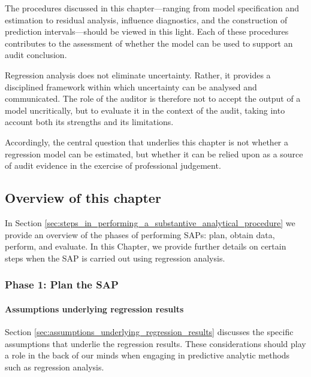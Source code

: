 The procedures discussed in this chapter—ranging from model specification and estimation to residual analysis, influence diagnostics, and the construction of prediction intervals—should be viewed in this light. Each of these procedures contributes to the assessment of whether the model can be used to support an audit conclusion.

Regression analysis does not eliminate uncertainty. Rather, it provides a disciplined framework within which uncertainty can be analysed and communicated. The role of the auditor is therefore not to accept the output of a model uncritically, but to evaluate it in the context of the audit, taking into account both its strengths and its limitations.

Accordingly, the central question that underlies this chapter is not whether a regression model can be estimated, but whether it can be relied upon as a source of audit evidence in the exercise of professional judgement.

\subsection{Overview of this chapter} %
\label{sub:overview_of_this_chapter}

In Section \ref{sec:steps_in_performing_a_substantive_analytical_procedure} we provide an overview of the phases of performing SAPs: plan, obtain data, perform, and evaluate. In this Chapter, we provide further details on certain steps when the SAP is carried out using regression analysis.

\subsubsection{Phase 1: Plan the SAP}

\paragraph{Assumptions underlying regression results} %
\label{par:assumptions_underlying_regression_results}

Section \ref{sec:assumptions_underlying_regression_results} discusses the specific assumptions that underlie the regression results. These consi\-derations should play a role in the back of our minds when engaging in predictive analytic methods such as regression analysis.


